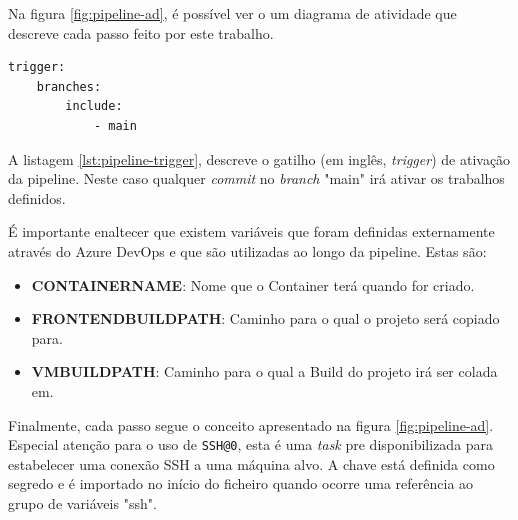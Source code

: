 Na figura \ref{fig:pipeline-ad}, é possível ver o um diagrama de atividade que descreve cada passo feito por este trabalho.

\begin{lstlisting}[caption={Trigger - Pipeline},label={lst:pipeline-trigger}]
trigger:
    branches:
        include:
            - main
\end{lstlisting}


A listagem \ref{lst:pipeline-trigger}, descreve o gatilho (em inglês, \textit{trigger}) de ativação da pipeline. Neste caso qualquer \textit{commit} no \textit{branch} "main" irá ativar os trabalhos definidos.

É importante enaltecer que existem variáveis que foram definidas externamente através do Azure DevOps e que são utilizadas ao longo da pipeline. Estas são:

\begin{itemize}
    \item \textbf{CONTAINERNAME}: Nome que o \gls{Container} terá quando for criado.
    \item \textbf{FRONTENDBUILDPATH}: Caminho para o qual o projeto será copiado para.
    \item \textbf{VMBUILDPATH}: Caminho para o qual a \gls{Build} do projeto irá ser colada em.
\end{itemize}

Finalmente, cada passo segue o conceito apresentado na figura \ref{fig:pipeline-ad}. Especial atenção para o uso de \lstinline|SSH@0|\cite{docs-SSH0}, esta é uma \textit{task} pre disponibilizada para estabelecer uma conexão SSH a uma máquina alvo. A chave está definida como segredo e é importado no início do ficheiro quando ocorre uma referência ao grupo de variáveis "ssh".
